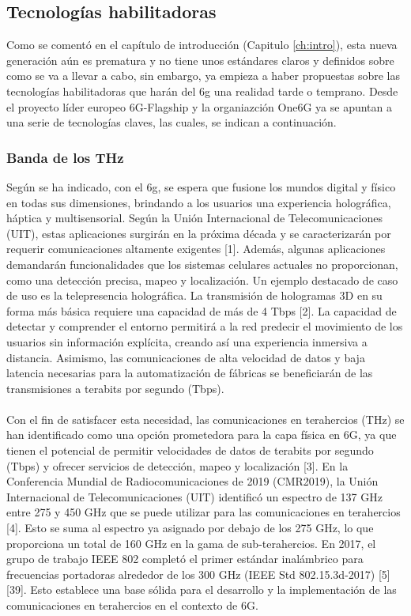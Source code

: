 \subsection{Tecnologías habilitadoras}

Como se comentó en el capítulo de introducción (Capitulo \ref{ch:intro}), esta nueva generación aún es prematura y no tiene unos estándares claros y definidos sobre como se va a llevar a cabo, sin embargo, ya empieza a haber propuestas sobre las tecnologías habilitadoras que harán del \gls{6g} una realidad tarde o temprano. Desde el proyecto líder europeo  6G-Flagship y la organiazción One6G ya se apuntan a una serie de tecnologías claves, las cuales, se indican a continuación.

\subsubsection{Banda de los THz}

Según se ha indicado, con el \gls{6g}, se espera que fusione los mundos digital y físico en todas sus dimensiones, brindando a los usuarios una experiencia holográfica, háptica y multisensorial. Según la Unión Internacional de Telecomunicaciones (UIT), estas aplicaciones surgirán en la próxima década y se caracterizarán por requerir comunicaciones altamente exigentes [1]. Además, algunas aplicaciones demandarán funcionalidades que los sistemas celulares actuales no proporcionan, como una detección precisa, mapeo y localización. Un ejemplo destacado de caso de uso es la telepresencia holográfica. La transmisión de hologramas 3D en su forma más básica requiere una capacidad de más de 4 Tbps [2]. La capacidad de detectar y comprender el entorno permitirá a la red predecir el movimiento de los usuarios sin información explícita, creando así una experiencia inmersiva a distancia. Asimismo, las comunicaciones de alta velocidad de datos y baja latencia necesarias para la automatización de fábricas se beneficiarán de las transmisiones a terabits por segundo (Tbps). \\
\\
Con el fin de satisfacer esta necesidad, las comunicaciones en terahercios (THz) se han identificado como una opción prometedora para la capa física en 6G, ya que tienen el potencial de permitir velocidades de datos de terabits por segundo (Tbps) y ofrecer servicios de detección, mapeo y localización [3]. En la Conferencia Mundial de Radiocomunicaciones de 2019 (CMR2019), la Unión Internacional de Telecomunicaciones (UIT) identificó un espectro de 137 GHz entre 275 y 450 GHz que se puede utilizar para las comunicaciones en terahercios [4]. Esto se suma al espectro ya asignado por debajo de los 275 GHz, lo que proporciona un total de 160 GHz en la gama de sub-terahercios. En 2017, el grupo de trabajo IEEE 802 completó el primer estándar inalámbrico para frecuencias portadoras alrededor de los 300 GHz (IEEE Std 802.15.3d-2017) [5][39]. Esto establece una base sólida para el desarrollo y la implementación de las comunicaciones en terahercios en el contexto de 6G.

